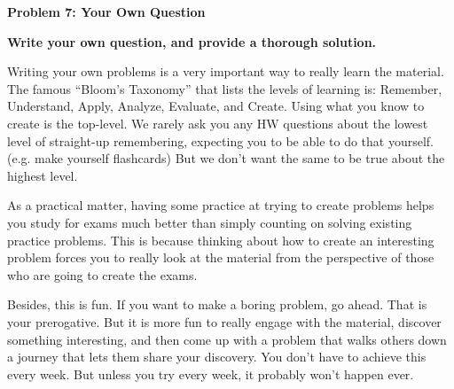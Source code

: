 \documentclass{article}\usepackage[utf8]{inputenc}\usepackage[margin=0.4cm,top=0.4cm,bottom=0.4cm]{geometry}\usepackage[usenames,dvipsnames,svgnames,table]{xcolor}
\begin{document}
\vspace{-2mm}\noindent\begin{mybox}{\begin{center}\textbf{\color{black}Problem 7: Your Own Question}\end{center}}\end{mybox}\vspace{-2mm}
\vspace{10pt}
\noindent \textbf{Write your own question, and provide a thorough solution.}
\vspace{3pt}

\noindent Writing your own problems is a very important way to really learn the material. The famous ``Bloom's Taxonomy'' that lists the levels of learning is: Remember, Understand, Apply, Analyze, Evaluate, and Create. Using what you know to create is the top-level. We rarely ask you any HW questions about the lowest level of straight-up remembering, expecting you to be able to do that yourself. (e.g. make yourself flashcards) But we don't want the same to be true about the highest level.
\vspace{3pt}

\noindent As a practical matter, having some practice at trying to create problems helps you study for exams much better than simply counting on solving existing practice problems. This is because thinking about how to create an interesting problem forces you to really look at the material from the perspective of those who are going to create the exams. 
\vspace{3pt}

\noindent Besides, this is fun. If you want to make a boring problem, go ahead. That is your prerogative. But it is more fun to really engage with the material, discover something interesting, and then come up with a problem that walks others down a journey that lets them share your discovery. You don't have to achieve this every week. But unless you try every week, it probably won't happen ever. 
\BeginSolution
\EndSolution
\clearpage
\end{document}
